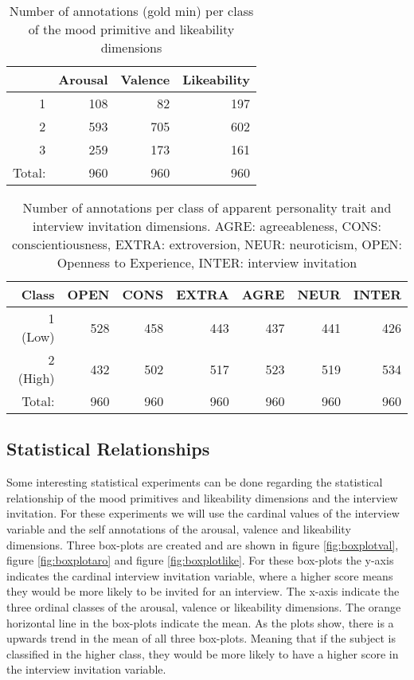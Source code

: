 \begin{table}[h]
\begin{tabular}{|r|r|r|r|}
\hline
\rowcolor{Gray} 
\multicolumn{1}{|l|}{Class} &
  \multicolumn{1}{l|}{Arousal} &
  \multicolumn{1}{l|}{Valence} &
  \multicolumn{1}{l|}{Likeability} \\ \hline
1                           & 108 & 82  & 197 \\ \hline
2                           & 593 & 705 & 602 \\ \hline
3                           & 259 & 173 & 161 \\ \hline
\multicolumn{1}{|l|}{Total:} & 960 & 960 & 960 \\ \hline
\end{tabular}
\caption{Number of annotations (gold min) per class of the mood primitive and likeability dimensions}
\label{tab:goldcount}
\end{table}

\begin{table*}[h]
\begin{tabular}{|r|r|r|r|r|r|r|}
\hline
\rowcolor{Gray} Class &
  \multicolumn{1}{l|}{OPEN} & 
  \multicolumn{1}{l|}{CONS} &
  \multicolumn{1}{l|}{EXTRA} &
  \multicolumn{1}{l|}{AGRE} &
  \multicolumn{1}{l|}{NEUR} &
  \multicolumn{1}{l|}{INTER} \\ \hline
1 (Low)    & 528 & 458 & 443 & 437 & 441 & 426 \\ \hline
2 (High)    & 432 & 502 & 517 & 523 & 519 & 534 \\ \hline
Total: & 960 & 960 & 960 & 960 & 960 & 960 \\ \hline
\end{tabular}
\caption{Number of annotations per class of apparent personality trait and interview invitation dimensions. AGRE: agreeableness, CONS: conscientiousness, EXTRA: extroversion, NEUR: neuroticism, OPEN: Openness to Experience, INTER: interview invitation}
\label{tab:personcount}
\end{table*}

\subsection{Statistical Relationships}

Some interesting statistical experiments can be done regarding the statistical relationship of the mood primitives and likeability dimensions and the interview invitation. For these experiments we will use the cardinal values of the interview variable and the self annotations of the arousal, valence and likeability dimensions. Three box-plots are created and are shown in figure \ref{fig:boxplotval}, figure \ref{fig:boxplotaro} and figure \ref{fig:boxplotlike}. For these box-plots the y-axis indicates the cardinal interview invitation variable, where a higher score means they would be more likely to be invited for an interview. The x-axis indicate the three ordinal classes of the arousal, valence or likeability dimensions. The orange horizontal line in the box-plots indicate the mean. As the plots show, there is a upwards trend in the mean of all three box-plots. Meaning that if the subject is classified in the higher class, they would be more likely to have a higher score in the interview invitation variable.

